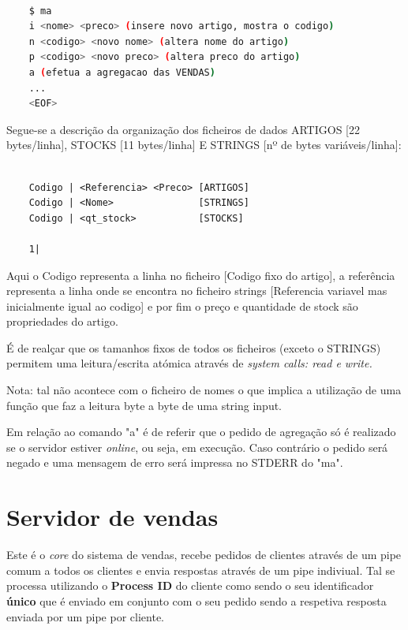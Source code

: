 \documentclass[a4paper,11pt]{report}
\begin{document}
\begin{lstlisting}[language=bash]

    $ ma
    i <nome> <preco> (insere novo artigo, mostra o codigo)
    n <codigo> <novo nome> (altera nome do artigo)
    p <codigo> <novo preco> (altera preco do artigo)
    a (efetua a agregacao das VENDAS)
    ...
    <EOF>

\end{lstlisting}
    
Segue-se a descrição da organização dos ficheiros de dados ARTIGOS [22 bytes/linha], STOCKS [11 bytes/linha] E STRINGS [nº de bytes variáveis/linha]:

\begin{lstlisting}
    
    Codigo | <Referencia> <Preco> [ARTIGOS]
    Codigo | <Nome>               [STRINGS]
    Codigo | <qt_stock>           [STOCKS]
    
    1| 

\end{lstlisting}
   
Aqui o Codigo representa a linha no ficheiro [Codigo fixo do artigo], a referência representa a linha onde se encontra no ficheiro strings [Referencia variavel mas inicialmente igual ao codigo] e por fim o preço e quantidade de stock são propriedades do artigo.

É de realçar que os tamanhos fixos de todos os ficheiros (exceto o STRINGS) permitem uma leitura/escrita atómica através de \textit{system calls: read e write.} \par 
Nota: tal não acontece com o ficheiro de nomes o que implica a utilização de uma função que faz a leitura byte a byte de uma string input.

Em relação ao comando "a" é de referir que o pedido de agregação só é realizado se o servidor estiver \textit{online}, ou seja, em execução. Caso contrário o pedido será negado e uma mensagem de erro será impressa no STDERR do "ma".

\section{Servidor de vendas}

\hspace{0.50cm} Este é o \textit{core} do sistema de vendas, recebe pedidos de clientes através de um pipe comum a todos os clientes e envia respostas através de um pipe indiviual. Tal se processa utilizando o \textbf{Process ID} do cliente como sendo o seu identificador \textbf{único} que é enviado em conjunto com o seu pedido sendo a respetiva resposta enviada por um pipe por cliente. \par
\end{document}
